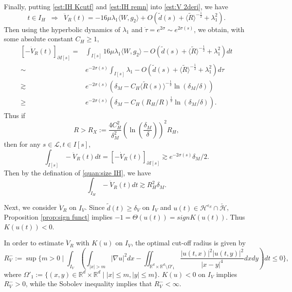 \documentclass[reqno, 11pt]{amsart}
\numberwithin{equation}{section}
\newcommand{\R}{\mathbb{R}}
\theoremstyle{plain}
\theoremstyle{definition}
\numberwithin{equation}{section}
\numberwithin{theorem}{section}
\numberwithin{equation}{section}
\numberwithin{equation}{section}
\numberwithin{theorem}{section}
\begin{document}
	Finally, putting \eqref{est:IH Kcutf} and \eqref{est:IH remn} into \eqref{est:V 2deri}, we have
	\begin{equation*}
	t\in I_H\;\;\Longrightarrow\;\;\ddot{V}_R(t)=-16\mu\lambda_{1} \langle W,g_2\rangle+O\left( \widetilde{d}(s)+\langle \widetilde{R} \rangle^{-\frac{1}{2}}+\lambda_{1}^2 \right).
	\end{equation*}
	Then using the hyperbolic dynamics of $\lambda_{1}$ and $\dot{\tau}=e^{2\sigma}\sim e^{2\sigma(s)}$, we obtain, with some absolute constant $C_H\geq 1$,
	\begin{equation*}
	\begin{aligned}
	[-\dot{V}_R(t)]_{\partial I[s]}=&\int_{I[s]} 16\mu\lambda_{1} \langle W,g_2\rangle-O\left( \widetilde{d}(s)+\langle \widetilde{R} \rangle^{-\frac{1}{2}}+\lambda_{1}^2 \right)dt\\\sim&e^{-2\sigma(s)}\int_{I[s]} \lambda_{1}-O\left( \widetilde{d}(s)+\langle \widetilde{R} \rangle^{-\frac{1}{2}}+\lambda_{1}^2 \right)d\tau\\\gtrsim& e^{-2\sigma(s)}\left( \delta_{M}-C_{H}\langle \widetilde{R}(s) \rangle^{-\frac{1}{2}}\ln \left(\delta_{M}/\delta \right) \right)\\\geq& e^{-2\sigma(s)}\left( \delta_{M}-C_{H}\left(R_H/R\right)^{\frac{1}{2}}\ln \left( \delta_{M}/\delta\right) \right).
	\end{aligned}
	\end{equation*}
	Thus if
	\begin{equation*}
	R>R_X :=\frac{4C_{H}^2}{\delta_{M}^2}\left( \ln \left( \frac{\delta_{M}}{\delta}\right) \right)^2 R_H, 
	\end{equation*}
	then for any $s\in \mathscr{L}, t\in I[s]$,
	\begin{equation*}
	\int_{I[s]}-\ddot{V}_R(t)dt=[-\dot{V}_R(t)]_{\partial I[s]}\gtrsim e^{-2\sigma(s)}\delta_{M}/2.
	\end{equation*}
	Then by the defination of \eqref{quan:size IH}, we have 
	\begin{equation}\label{est:IH int blow}
	\int_{I_H} -\ddot{V}_R(t) dt \gtrsim R_H^2 \delta_{M}.
	\end{equation}
	
	Next, we consider $\ddot{V}_R$ on $I_V$. Since $\widetilde{d}(t)\geq\delta_{V}$ on $I_V$ and $u
	(t)\in\mathcal{H}^{\epsilon_S}\cap \check{\mathcal{H}}$, Proposition \ref{prop:sign funct} implies $-1=\Theta(u(t))=signK(u(t))$. Thus $K(u(t))<0$.
	
	In order to estimate $\ddot{V}_R$ with $K(u)$ on $I_V$, the optimal cut-off radius is given by
	\begin{equation*}
	R_{V}^{-}:=\sup\{m>0\;\Big|\;\int_{I_V}\left( \int_{|x|>m}|\nabla u|^{2}dx-\iint_{\R^d\times \R^d \setminus \varOmega'_1} \frac{\big|u(t,x)\big|^2\big|u(t,y)\big|^2}{|x-y|^4} dxdy\right)dt\leq0  \},
	\end{equation*}
	where $\varOmega'_1 :=\{(x,y)\in\R^d\times\R^d\;|\;|x|\leq m,|y|\leq m\}$. $K(u)<0$ on $I_V$ implies $R_{V}^{-}>0$, while the Sobolev inequality implies that $R_{V}^{-}<\infty$. 
	
\end{document}
